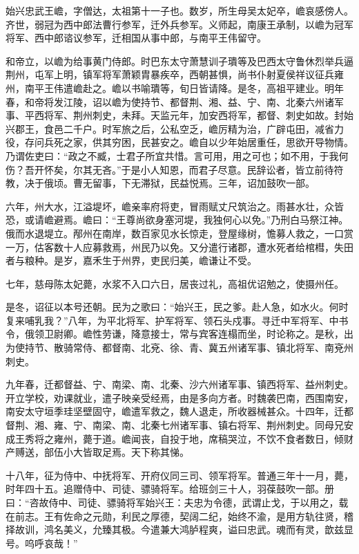 \documentclass[12pt,UTF8]{ctexbook}
\begin{document}
始兴忠武王嶦，字僧达，太祖第十一子也。数岁，所生母吴太妃卒，嶦哀感傍人。齐世，弱冠为西中郎法曹行参军，迁外兵参军。义师起，南康王承制，以嶦为冠军将军、西中郎谘议参军，迁相国从事中郎，与南平王伟留守。

和帝立，以嶦为给事黄门侍郎。时巴东太守萧慧训子璝等及巴西太守鲁休烈举兵逼荆州，屯军上明，镇军将军萧颖胄暴疾卒，西朝甚惧，尚书仆射夏侯祥议征兵雍州，南平王伟遣嶦赴之。嶦以书喻璝等，旬日皆请降。是冬，高祖平建业。明年春，和帝将发江陵，诏以嶦为使持节、都督荆、湘、益、宁、南、北秦六州诸军事、平西将军、荆州刺史，未拜。天监元年，加安西将军，都督、刺史如故。封始兴郡王，食邑二千户。时军旅之后，公私空乏，嶦厉精为治，广辟屯田，减省力役，存问兵死之家，供其穷困，民甚安之。嶦自以少年始居重任，思欲开导物情。乃谓佐吏曰：“政之不臧，士君子所宜共惜。言可用，用之可也；如不用，于我何伤？吾开怀矣，尔其无吝。”于是小人知恩，而君子尽意。民辞讼者，皆立前待符教，决于俄顷。曹无留事，下无滞狱，民益悦焉。三年，诏加鼓吹一部。

六年，州大水，江溢堤坏，嶦亲率府将吏，冒雨赋丈尺筑治之。雨甚水壮，众皆恐，或请嶦避焉。嶦曰：“王尊尚欲身塞河堤，我独何心以免。”乃刑白马祭江神。俄而水退堤立。邴州在南岸，数百家见水长惊走，登屋缘树，憺募人救之，一口赏一万，估客数十人应募救焉，州民乃以免。又分遣行诸郡，遭水死者给棺槥，失田者与粮种。是岁，嘉禾生于州界，吏民归美，嶦谦让不受。

七年，慈母陈太妃薨，水浆不入口六日，居丧过礼，高祖优诏勉之，使摄州任。

是冬，诏征以本号还朝。民为之歌曰：“始兴王，民之爹。赴人急，如水火。何时复来哺乳我？”八年，为平北将军、护军将军、领石头戍事。寻迁中军将军、中书令，俄领卫尉卿。嶦性劳谦，降意接士，常与宾客连榻而坐，时论称之。是秋，出为使持节、散骑常侍、都督南、北兗、徐、青、冀五州诸军事、镇北将军、南兗州刺史。

九年春，迁都督益、宁、南梁、南、北秦、沙六州诸军事、镇西将军、益州刺史。开立学校，劝课就业，遣子映亲受经焉，由是多向方者。时魏袭巴南，西围南安，南安太守垣季珪坚壁固守，嶦遣军救之，魏人退走，所收器械甚众。十四年，迁都督荆、湘、雍、宁、南梁、南、北秦七州诸军事、镇右将军、荆州刺史。同母兄安成王秀将之雍州，薨于道。嶦闻丧，自投于地，席稿哭泣，不饮不食者数日，倾财产赙送，部伍小大皆取足焉。天下称其悌。

十八年，征为侍中、中抚将军、开府仪同三司、领军将军。普通三年十一月，薨，时年四十五。追赠侍中、司徒、骠骑将军。给班剑三十人，羽葆鼓吹一部。册曰：“咨故侍中、司徒、骠骑将军始兴王：夫忠为令德，武谓止戈，于以用之，载在前志。王有佐命之元勋，利民之厚德，契阔二纪，始终不渝，是用方轨往贤，稽择故训，鸿名美义，允臻其极。今遣兼大鸿胪程爽，谥曰忠武。魂而有灵，歆兹显号。呜呼哀哉！”
\end{document}
